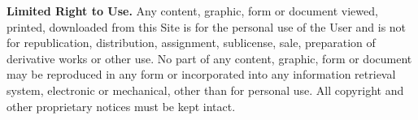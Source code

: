\textbf{Limited Right to Use.}
Any content, graphic, form or document viewed, printed, downloaded from this
Site is for the personal use of the User and is not for republication,
distribution, assignment, sublicense, sale, preparation of derivative works or
other use. No part of any content, graphic, form or document may be reproduced
in any form or incorporated into any information retrieval system, electronic or
mechanical, other than for personal use. All copyright and other proprietary
notices must be kept intact.